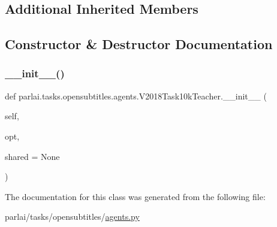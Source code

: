 \subsection*{Additional Inherited Members}


\subsection{Constructor \& Destructor Documentation}
\mbox{\label{classparlai_1_1tasks_1_1opensubtitles_1_1agents_1_1V2018Task10kTeacher_af6e78685bc810f960b3d35b1dd1bf281}} 
\subsubsection{\texorpdfstring{\+\_\+\+\_\+init\+\_\+\+\_\+()}{\_\_init\_\_()}}
{\footnotesize\ttfamily def parlai.\+tasks.\+opensubtitles.\+agents.\+V2018\+Task10k\+Teacher.\+\_\+\+\_\+init\+\_\+\+\_\+ (\begin{DoxyParamCaption}\item[{}]{self,  }\item[{}]{opt,  }\item[{}]{shared = {\ttfamily None} }\end{DoxyParamCaption})}



The documentation for this class was generated from the following file\+:\begin{DoxyCompactItemize}
\item 
parlai/tasks/opensubtitles/\hyperlink{parlai_2tasks_2opensubtitles_2agents_8py}{agents.\+py}\end{DoxyCompactItemize}
